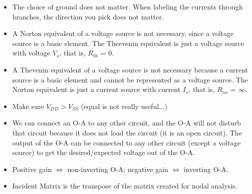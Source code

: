 \documentclass{article}
\begin{document}
\begin{itemize}
	\item The choice of ground does not matter. When labeling the currents through branches, the direction you pick does not matter.
	\item A Norton equivalent of a voltage source is not necessary, since a voltage source is a basic element. The Theevenin equivalent is just a voltage source with voltage $V_s$, that is, $R_{th}$ = 0.
	\item A Thevenin equivalent of a voltage source is not necessary because a current source is a basic element and cannot be represented as a voltage source. The Norton equivalent is just a current source with current $I_s$, that is, $R_{no}$ = $\infty$.
	\item Make sure $V_{DD} > V_{SS}$ (equal is not really useful...)
	\item We can connect an O-A to any other circuit, and the O-A will not disturb that circuit because it does not load the circuit (it is an open circuit). The output of the O-A can be connected to any other circuit (except a voltage source) to get the desired/expected voltage out of the O-A.
	\item Positive gain $\iff$ non-inverting O-A; negative gain $\iff$ inverting O-A.
	\item Incident Matrix is the transpose of the matrix created for nodal analysis.
\end{itemize}
\end{document}
